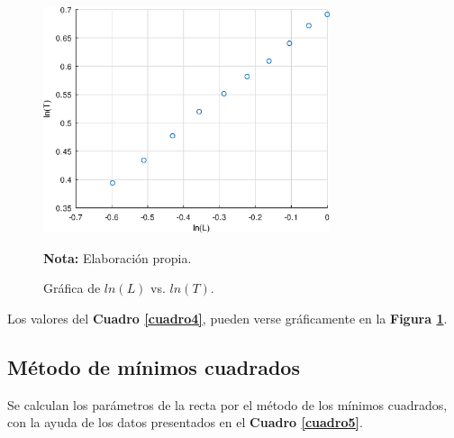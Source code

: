\documentclass[letter,11pt]{article}
\newcommand{\source}[1]{\vspace{-11pt} \caption*{\small{\textbf{Nota:} {#1}}}}
\begin{document}
\begin{figure}
\centering
\includegraphics[width=0.75\textwidth]{resources/o1.2.eps}
\caption{Gráfica de $ln(L)$ vs. $ln(T)$.}
\label{figura4}
\source{Elaboración propia.}
\end{figure}

Los valores del \textbf{Cuadro \ref{cuadro4}}, pueden verse gráficamente en la
\textbf{Figura \ref{figura4}}.

\subsection{Método de mínimos cuadrados}

Se calculan los parámetros de la recta por el método de los mínimos cuadrados,
con la ayuda de los datos presentados en el \textbf{Cuadro \ref{cuadro5}}.
\end{document}
